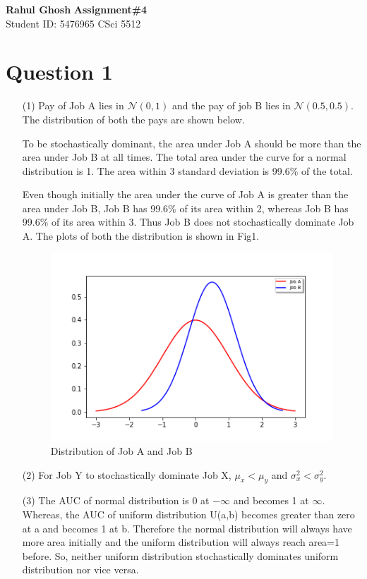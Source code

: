 \documentclass[letter, 10pt]{article}
\begin{document}
\noindent
\large \textbf{Rahul Ghosh} \hfill \textbf{Assignment\#4}\\
\normalsize Student ID: 5476965 \hfill CSci 5512\\

\section*{Question 1}
\begin{itemize}
    \item[(1)] Pay of Job A lies in $\mathcal{N}(0,1)$ and the pay of job B lies in $\mathcal{N}(0.5,0.5)$. The distribution of both the pays are shown below.

    To be stochastically dominant, the area under Job A should be more than the area under Job B at all times. The total area under the curve for a normal distribution is 1. The area within 3 standard deviation is 99.6\% of the total.
    
    Even though initially the area under the curve of Job A is greater than the area under Job B, Job B has 99.6\% of its area within 2, whereas Job B has 99.6\% of its area within 3. Thus Job B does not stochastically dominate Job A. The plots of both the distribution is shown in Fig1.
    
    \begin{figure}[H]
        \centering
        \includegraphics[width=\textwidth, height=0.4\textwidth]{HW4/P1.png}
        \caption{Distribution of Job A and Job B}
    \end{figure}
    
    \item[(2)] For Job Y to stochastically dominate Job X, $\mu_x<\mu_y$ and $\sigma^2_x<\sigma^2_y$.
    
    \item[(3)] The AUC of normal distribution is 0 at $-\infty$ and becomes 1 at $\infty$. Whereas, the AUC of uniform distribution U(a,b) becomes greater than zero at a and becomes 1 at b. Therefore the normal distribution will always have more area initially and the uniform distribution will always reach area=1 before. So, neither uniform distribution stochastically dominates uniform distribution nor vice versa.
\end{itemize}
\end{document}
